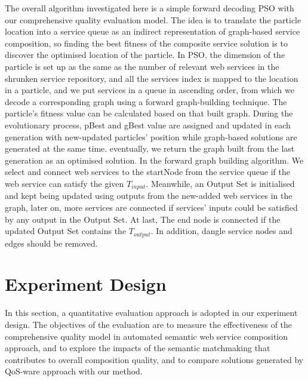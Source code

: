 \documentclass{llncs}
\begin{document}
The overall algorithm investigated here is a simple forward decoding PSO \cite{da2016particle} with our comprehensive quality evaluation model. The idea is to translate the particle location into a service queue as an indirect representation of graph-based service composition, so finding the best fitness of the composite service solution is to discover the optimised location of the particle. In PSO, the dimension of the particle is set up as the same as the number of relevant web services in the shrunken service repository, and all the services index is mapped to the location in a particle, and we put services in a queue in ascending order, from which we decode a corresponding graph using a forward graph-building technique. The particle's fitness value can be calculated based on that built graph. During the evolutionary process, pBest and gBest value are assigned and updated in each generation with new-updated particles' position while graph-based solutions are generated at the same time. eventually, we return the graph built from the last generation as an optimised solution. In the forward graph building algorithm. We select and connect web services to the startNode from the service queue if the web service can satisfy the given $T_{input}$. Meanwhile, an Output Set is initialised and kept being updated using outputs from the new-added web services in the graph, later on, more services are connected if services' inputs could be satisfied by any output in the Output Set. At last, The end node is connected if the updated Output Set contains the $T_{output}$. In addition, dangle service nodes and edges should be removed. 



\section{Experiment Design}\label{experiment_design}
In this section, a quantitative evaluation approach is adopted in our experiment design. The objectives of the evaluation are to measure the effectiveness of the comprehensive quality model in automated semantic web service composition approach, and to explore the impacts of the semantic matchmaking that contributes to overall composition quality, and to compare solutions generated by QoS-ware approach with our method.
\end{document}
